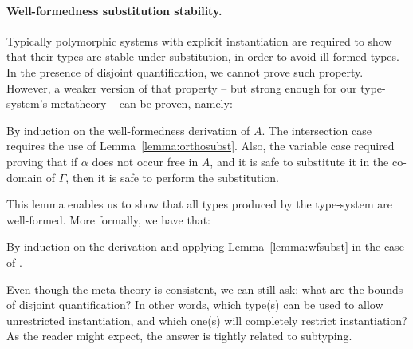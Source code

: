 \paragraph{Well-formedness substitution stability.}
Typically polymorphic systems with explicit instantiation are required to show that their
types are stable under substitution, in order to avoid ill-formed types.
In the presence of disjoint quantification, we cannot prove such property.
However, a weaker version of that property -- but strong enough for our type-system's metatheory 
-- can be proven, namely:

%
{By induction on the well-formedness derivation of $A$.
The intersection case requires the use of Lemma~\ref{lemma:orthosubst}.
Also, the variable case required proving that if $\alpha$ does not occur free in $A$, and it is safe
to substitute it in the co-domain of $\Gamma$, then it is safe to perform the substitution.}

This lemma enables us to show that all types produced by the type-system are well-formed.
More formally, we have that:

{By induction on the derivation and applying
  Lemma~\ref{lemma:wfsubst} in the case of .}

Even though the meta-theory is consistent, we can still ask: 
what are the bounds of disjoint quantification?
In other words, which type(s) can be used to allow unrestricted instantiation, and which
one(s) will completely restrict instantiation?
As the reader might expect, the answer is tightly related to subtyping. 

